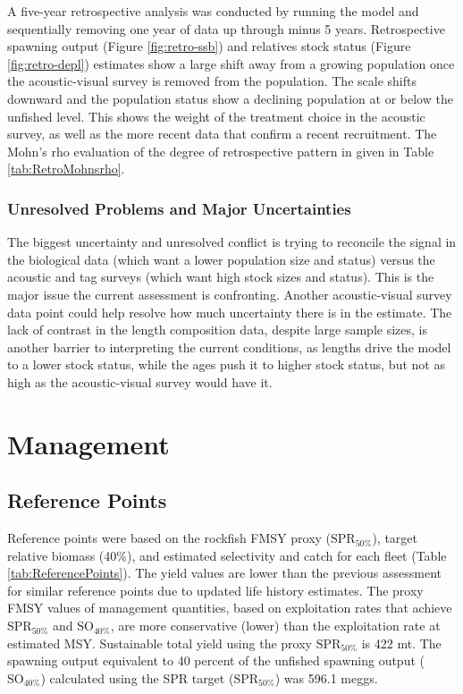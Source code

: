 \documentclass[11pt,
  letterpaper,
]{article}
\begin{document}
A five-year retrospective analysis was conducted by running the model and sequentially removing one year of data up through minus 5 years. Retrospective spawning output (Figure \ref{fig:retro-ssb}) and relatives stock status (Figure \ref{fig:retro-depl}) estimates show a large shift away from a growing population once the acoustic-visual survey is removed from the population. The scale shifts downward and the population status show a declining population at or below the unfished level. This shows the weight of the treatment choice in the acoustic survey, as well as the more recent data that confirm a recent recruitment. The Mohn's rho evaluation of the degree of retrospective pattern in given in Table \ref{tab:RetroMohnsrho}.

\hypertarget{unresolved-problems-and-major-uncertainties-1}{%
\subsubsection{Unresolved Problems and Major Uncertainties}\label{unresolved-problems-and-major-uncertainties-1}}

The biggest uncertainty and unresolved conflict is trying to reconcile the signal in the biological data (which want a lower population size and status) versus the acoustic and tag surveys (which want high stock sizes and status). This is the major issue the current assessment is confronting. Another acoustic-visual survey data point could help resolve how much uncertainty there is in the estimate. The lack of contrast in the length composition data, despite large sample sizes, is another barrier to interpreting the current conditions, as lengths drive the model to a lower stock status, while the ages push it to higher stock status, but not as high as the acoustic-visual survey would have it.

\hypertarget{management}{%
\section{Management}\label{management}}

\hypertarget{reference-points-1}{%
\subsection{Reference Points}\label{reference-points-1}}

Reference points were based on the rockfish FMSY proxy (\(\text{SPR}_{50\%}\)), target relative biomass (40\%), and estimated selectivity and catch for each fleet (Table \ref{tab:ReferencePoints}). The yield values are lower than the previous assessment for similar reference points due to updated life history estimates. The proxy FMSY values of management quantities, based on exploitation rates that achieve \(\text{SPR}_{50\%}\) and \(\text{SO}_{40\%}\), are more conservative (lower) than the exploitation rate at estimated MSY. Sustainable total yield using the proxy \(\text{SPR}_{50\%}\) is 422 mt. The spawning output equivalent to 40 percent of the unfished spawning output (\(\text{SO}_{40\%}\)) calculated using the SPR target (\(\text{SPR}_{50\%}\)) was 596.1 meggs.
\end{document}
